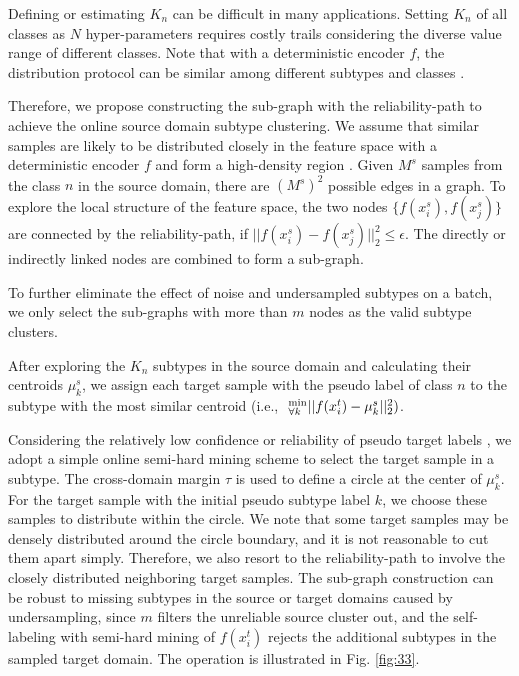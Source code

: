 Defining or estimating $K_n$ can be difficult in many applications. Setting $K_n$ of all classes as $N$ hyper-parameters requires costly trails considering the diverse value range of different classes. Note that with a deterministic encoder $f$, the distribution protocol can be similar among different subtypes and classes \cite{fahad2014survey}. 
 
 
 

Therefore, we propose constructing the sub-graph with the reliability-path to achieve the online source domain subtype clustering. We assume that similar samples are likely to be distributed closely in the feature space with a deterministic encoder $f$ and form a high-density region \cite{carlucci2019domain}. Given $M^{s}$ samples from the class $n$ in the source domain, there are $(M^{s})^2$ possible edges in a graph. To explore the local structure of the feature space, the two nodes $\{f(x_i^s),f(x_j^s)\}$ are connected by the reliability-path, if $||f(x_i^s)-f(x_j^s)||_2^2\leq\epsilon$. The directly or indirectly linked nodes are combined to form a sub-graph. 

To further eliminate the effect of noise and undersampled subtypes on a batch, we only select the sub-graphs with more than $m$ nodes as the valid subtype clusters. 


After exploring the $K_n$ subtypes in the source domain and calculating their centroids $\mu_k^s$, we assign each target sample with the pseudo label of class $n$ to the subtype with the most similar centroid (i.e., $~_{\forall k}^{\rm min}||f(x_i^t)-\mu_k^s||_2^2)$. 

Considering the relatively low confidence or reliability of pseudo target labels \cite{zou2019confidence,gu2020spherical}, we adopt a simple online semi-hard mining scheme to select the target sample in a subtype. The cross-domain margin $\tau$ is used to define a circle at the center of $\mu_k^s$. For the target sample with the initial pseudo subtype label $k$, we choose these samples to distribute within the circle. We note that some target samples may be densely distributed around the circle boundary, and it is not reasonable to cut them apart simply. Therefore, we also resort to the reliability-path to involve the closely distributed neighboring target samples. The sub-graph construction can be robust to missing subtypes in the source or target domains caused by undersampling, since $m$ filters the unreliable source cluster out, and the self-labeling with semi-hard mining of $f(x_i^t)$ rejects the additional subtypes in the sampled target domain. The operation is illustrated in Fig. \ref{fig:33}.

